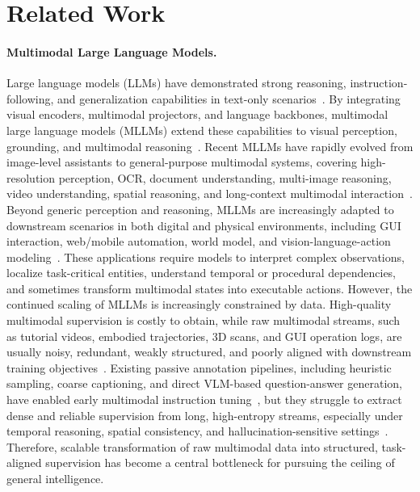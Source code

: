 \section{Related Work}

\paragraph{Multimodal Large Language Models.}
Large language models (LLMs) have demonstrated strong reasoning, instruction-following, and generalization capabilities in text-only scenarios~\cite{gpt4,videollama,yang2025qwen3}. By integrating visual encoders, multimodal projectors, and language backbones, multimodal large language models (MLLMs) extend these capabilities to visual perception, grounding, and multimodal reasoning~\cite{llava,chen2023minigptv2,qwen2.5vl,chen2024internvl,gpt4o,gemini2.5}. Recent MLLMs have rapidly evolved from image-level assistants to general-purpose multimodal systems, covering high-resolution perception, OCR, document understanding, multi-image reasoning, video understanding, spatial reasoning, and long-context multimodal interaction~\cite{spatialvlm,vlm4d,vlmad,vlm2bench,vsibench,mmsibench}. Beyond generic perception and reasoning, MLLMs are increasingly adapted to downstream scenarios in both digital and physical environments, including GUI interaction, web/mobile automation, world model, and vision-language-action modeling~\cite{osworld,mind2web,savva2019habitat,dai2017scannet,openvla,pi0,gr3,worldvla,wan2024grid,li2026trajectory,luo2025canonswap,retrieve,prosr}. These applications require models to interpret complex observations, localize task-critical entities, understand temporal or procedural dependencies, and sometimes transform multimodal states into executable actions. However, the continued scaling of MLLMs is increasingly constrained by data. High-quality multimodal supervision is costly to obtain, while raw multimodal streams, such as tutorial videos, embodied trajectories, 3D scans, and GUI operation logs, are usually noisy, redundant, weakly structured, and poorly aligned with downstream training objectives~\cite{grauman2022ego4d,savva2019habitat,dai2017scannet,osworld,mind2web}. Existing passive annotation pipelines, including heuristic sampling, coarse captioning, and direct VLM-based question-answer generation, have enabled early multimodal instruction tuning~\cite{sharegpt4v,gao2024sphinx,chen2023minigptv2}, but they struggle to extract dense and reliable supervision from long, high-entropy streams, especially under temporal reasoning, spatial consistency, and hallucination-sensitive settings~\cite{hallusionbench,evaluating,disheng2024thinking,mico,li2025viewspatial}. Therefore, scalable transformation of raw multimodal data into structured, task-aligned supervision has become a central bottleneck for pursuing the ceiling of general intelligence.

